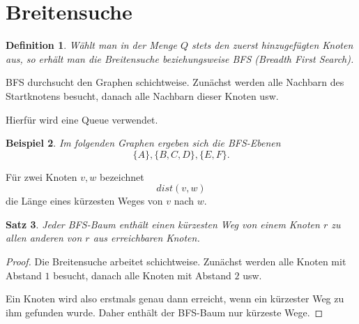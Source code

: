 \documentclass[12pt]{article}
\newtheorem{satz}{Satz}[section]
\newtheorem{definition}[satz]{Definition}
\newtheorem{beispiel}[satz]{Beispiel}
\begin{document}
\section{Breitensuche}

\begin{definition}
Wählt man in der Menge \(Q\) stets den zuerst hinzugefügten Knoten aus, so erhält man die Breitensuche beziehungsweise BFS (\emph{Breadth First Search}).
\end{definition}

BFS durchsucht den Graphen schichtweise. Zunächst werden alle Nachbarn des Startknotens besucht, danach alle Nachbarn dieser Knoten usw.

Hierfür wird eine Queue verwendet.

\begin{beispiel}
Im folgenden Graphen ergeben sich die BFS-Ebenen
\[
\{A\},\{B,C,D\},\{E,F\}.
\]

\begin{center}
\end{center}
\end{beispiel}

Für zwei Knoten \(v,w\) bezeichnet
\[
dist(v,w)
\]
die Länge eines kürzesten Weges von \(v\) nach \(w\).

\begin{satz}
Jeder BFS-Baum enthält einen kürzesten Weg von einem Knoten \(r\) zu allen anderen von \(r\) aus erreichbaren Knoten.
\end{satz}

\begin{proof}
Die Breitensuche arbeitet schichtweise. Zunächst werden alle Knoten mit Abstand \(1\) besucht, danach alle Knoten mit Abstand \(2\) usw.

Ein Knoten wird also erstmals genau dann erreicht, wenn ein kürzester Weg zu ihm gefunden wurde. Daher enthält der BFS-Baum nur kürzeste Wege.
\end{proof}
\end{document}
